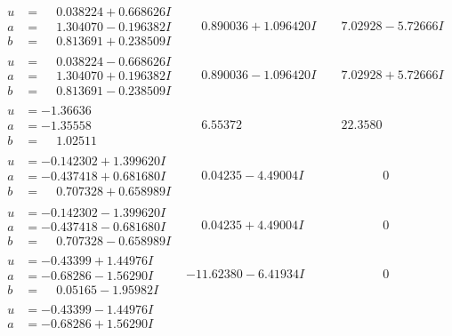 \documentclass[1p]{elsarticle_modified}
\theoremstyle{definition}
\begin{document}
$$\begin{array}{c|c|c}
\begin{aligned}
u &= \phantom{-}0.038224 + 0.668626 I \\
a &= \phantom{-}1.304070 - 0.196382 I \\
b &= \phantom{-}0.813691 + 0.238509 I\end{aligned}
 & \phantom{-}0.890036 + 1.096420 I & \phantom{-}7.02928 - 5.72666 I \\ \hline\begin{aligned}
u &= \phantom{-}0.038224 - 0.668626 I \\
a &= \phantom{-}1.304070 + 0.196382 I \\
b &= \phantom{-}0.813691 - 0.238509 I\end{aligned}
 & \phantom{-}0.890036 - 1.096420 I & \phantom{-}7.02928 + 5.72666 I \\ \hline\begin{aligned}
u &= -1.36636\phantom{ +0.000000I} \\
a &= -1.35558\phantom{ +0.000000I} \\
b &= \phantom{-}1.02511\phantom{ +0.000000I}\end{aligned}
 & \phantom{-}6.55372\phantom{ +0.000000I} & \phantom{-}22.3580\phantom{ +0.000000I} \\ \hline\begin{aligned}
u &= -0.142302 + 1.399620 I \\
a &= -0.437418 + 0.681680 I \\
b &= \phantom{-}0.707328 + 0.658989 I\end{aligned}
 & \phantom{-}0.04235 - 4.49004 I & \phantom{-0.000000 } 0 \\ \hline\begin{aligned}
u &= -0.142302 - 1.399620 I \\
a &= -0.437418 - 0.681680 I \\
b &= \phantom{-}0.707328 - 0.658989 I\end{aligned}
 & \phantom{-}0.04235 + 4.49004 I & \phantom{-0.000000 } 0 \\ \hline\begin{aligned}
u &= -0.43399 + 1.44976 I \\
a &= -0.68286 - 1.56290 I \\
b &= \phantom{-}0.05165 - 1.95982 I\end{aligned}
 & -11.62380 - 6.41934 I & \phantom{-0.000000 } 0 \\ \hline\begin{aligned}
u &= -0.43399 - 1.44976 I \\
a &= -0.68286 + 1.56290 I \\

\end{aligned}
\end{array}$$
\end{document}
